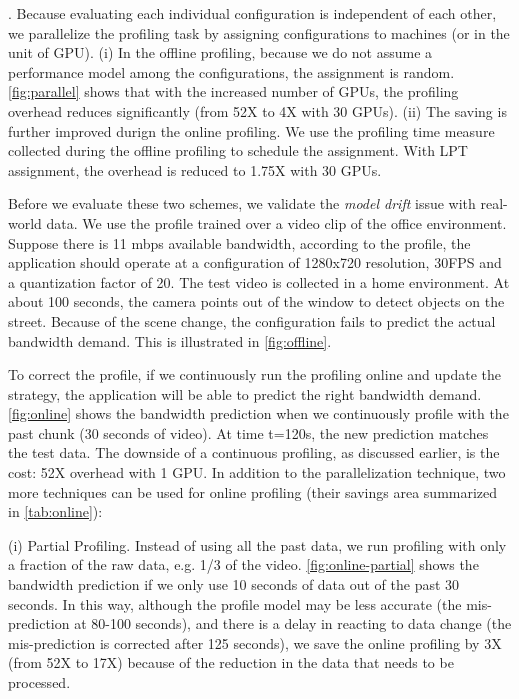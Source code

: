. Because evaluating each
individual configuration is independent of each other, we parallelize the
profiling task by assigning configurations to machines (or in the unit of
GPU). (i) In the offline profiling, because we do not assume a performance model
among the configurations, the assignment is random. \autoref{fig:parallel} shows
that with the increased number of GPUs, the profiling overhead reduces
significantly (from 52X to 4X with 30 GPUs). (ii) The saving is further improved
durign the online profiling. We use the profiling time measure collected during
the offline profiling to schedule the assignment. With LPT assignment, the
overhead is reduced to 1.75X with 30 GPUs.

 Before we evaluate these two
schemes, we validate the \textit{model drift} issue with real-world data. We use
the profile trained over a video clip of the office environment. Suppose there
is 11 mbps available bandwidth, according to the profile, the application should
operate at a configuration of 1280x720 resolution, 30FPS and a quantization
factor of 20. The test video is collected in a home environment. At about 100
seconds, the camera points out of the window to detect objects on the street.
Because of the scene change, the configuration fails to predict the actual
bandwidth demand. This is illustrated in \autoref{fig:offline}.

To correct the profile, if we continuously run the profiling online and update
the strategy, the application will be able to predict the right bandwidth
demand. \autoref{fig:online} shows the bandwidth prediction when we continuously
profile with the past chunk (30 seconds of video). At time t=120s, the new
prediction matches the test data. The downside of a continuous profiling, as
discussed earlier, is the cost: 52X overhead with 1 GPU. In addition to the
parallelization technique, two more techniques can be used for online profiling
(their savings area summarized in \autoref{tab:online}):

(i) Partial Profiling. Instead of using all the past data, we run profiling with
only a fraction of the raw data, e.g. 1/3 of the video.
\autoref{fig:online-partial} shows the bandwidth prediction if we only use 10
seconds of data out of the past 30 seconds. In this way, although the profile
model may be less accurate (the mis-prediction at 80-100 seconds), and there is
a delay in reacting to data change (the mis-prediction is corrected after 125
seconds), we save the online profiling by 3X (from 52X to 17X) because of the
reduction in the data that needs to be processed.

